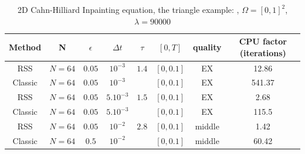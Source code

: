 \documentclass[hyperref={pdfpagemode=FullScreen},9pt]{beamer}
\begin{document}

 \begin{frame}
 {\small
 \begin{table}[!h]
\begin{center}
\begin{tabular}{|c|c||c|c|c|c|c|c|}
\hline 
Method& N & $\epsilon$ &  $\Delta t$& $\tau$  & $[0,T]$&quality &CPU factor (iterations)\\
 \hline
 RSS&$N=64$ & $0.05$ &  $10^{-3}$ & $1.4$  & $[0,0.1]$  & EX&12.86\\
 \hline
 Classic &$N=64$ & $0.05$ &  $10^{-3}$ & & $[0,0.1]$ &   EX&541.37\\
 \hline
 RSS&$N=64$ & $0.05$ &  $5.10^{-3}$ & $1.5$  & $[0,0.1]$  &EX&2.68\\
 \hline
 Classic &$N=64$ & $0.05$ &  $5.10^{-3}$ & & $[0,0.1]$ &   EX& 115.5\\
 \hline
 RSS&$N=64$ & $0.05$ &  $10^{-2}$ & $2.8$  & $[0,0.1]$  &middle&1.42\\
 \hline
 Classic &$N=64$ & $0.5$ &  $10^{-2}$ & & $[0,0.1]$ & middle &60.42\\
 \hline
 \hline
\end{tabular} 
\caption{2D Cahn-Hilliard Inpainting equation, the triangle example: , $\Omega=[0,1]^2$, $\lambda=90000$}
\label{AC_3D}
\end{center}
\end{table}
} 
 \end{frame}
\end{document}

